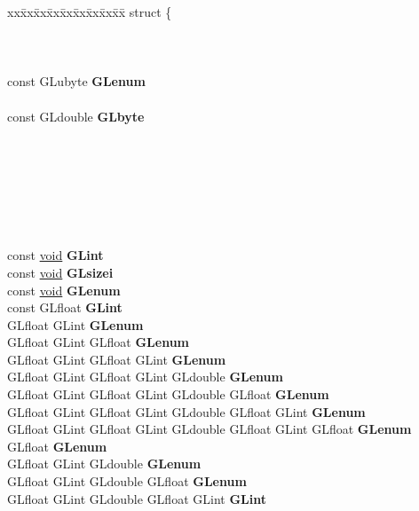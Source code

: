 \begin{DoxyCompactItemize}
\begin{tabbing}
\end{tabbing}\item 
\mbox{\label{structopengl__funcs_aacdf7cb6a88ee7485f7b9dbda9d38c6b}} 
\begin{tabbing}
xx\=xx\=xx\=xx\=xx\=xx\=xx\=xx\=xx\=\kill
struct \{\\
\\
\\
\\
\>const GLubyte {\bfseries GLenum}\\
\\
\>const GLdouble {\bfseries GLbyte}\\
\\
\\
\\
\\
\\
\\
\\
\>const \hyperlink{interfacevoid}{void} {\bfseries GLint}\\
\>const \hyperlink{interfacevoid}{void} {\bfseries GLsizei}\\
\>const \hyperlink{interfacevoid}{void} {\bfseries GLenum}\\
\>const GLfloat {\bfseries GLint}\\
\>GLfloat GLint {\bfseries GLenum}\\
\>GLfloat GLint GLfloat {\bfseries GLenum}\\
\>GLfloat GLint GLfloat GLint {\bfseries GLenum}\\
\>GLfloat GLint GLfloat GLint GLdouble {\bfseries GLenum}\\
\>GLfloat GLint GLfloat GLint GLdouble GLfloat {\bfseries GLenum}\\
\>GLfloat GLint GLfloat GLint GLdouble GLfloat GLint {\bfseries GLenum}\\
\>GLfloat GLint GLfloat GLint GLdouble GLfloat GLint GLfloat {\bfseries GLenum}\\
\>GLfloat {\bfseries GLenum}\\
\>GLfloat GLint GLdouble {\bfseries GLenum}\\
\>GLfloat GLint GLdouble GLfloat {\bfseries GLenum}\\
\>GLfloat GLint GLdouble GLfloat GLint {\bfseries GLint}\\

\end{tabbing}
\end{DoxyCompactItemize}
